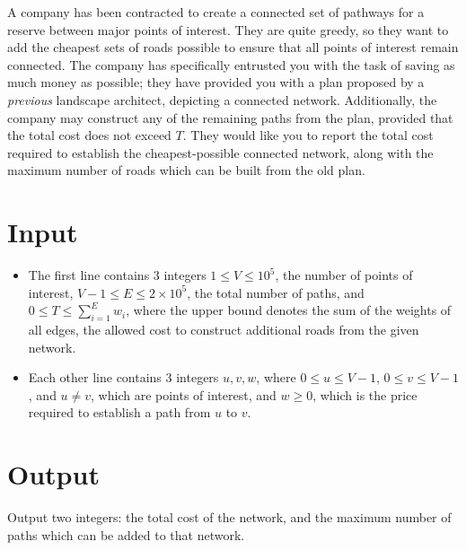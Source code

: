 A company has been contracted to create a connected set of pathways for a reserve between major points of interest. They are quite greedy, so they want to add the cheapest sets of roads possible to ensure that all points of interest remain connected. The company has specifically entrusted you with the task of saving as much money as possible; they have provided you with a plan proposed by a \textit{previous} landscape architect, depicting a connected network. Additionally, the company may construct any of the remaining paths from the plan, provided that the total cost does not exceed $T$. They would like you to report the total cost required to establish the cheapest-possible connected network, along with the maximum number of roads which can be built from the old plan.

\section*{Input}
\begin{itemize}
    \item The first line contains 3 integers $1 \leq V \leq 10^5$, the number of points of interest, $V-1 \leq E \leq 2 \times 10^5$, the total number of paths, and $0 \leq T \leq \sum_{i=1}^{E} w_{i}$, where the upper bound denotes the sum of the weights of all edges, the allowed cost to construct additional roads from the given network.
    \item Each other line contains 3 integers $u, v, w$, where $0 \leq u \leq V - 1$, $0 \leq v \leq V - 1$, and $u \neq v$, which are points of interest, and $w \geq 0$, which is the price required to establish a path from $u$ to $v$.
\end{itemize}

\section*{Output}
Output two integers: the total cost of the network, and the maximum number of paths which can be added to that network.